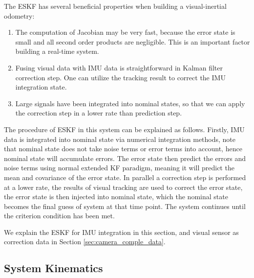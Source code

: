 The ESKF has several beneficial properties when building a visual-inertial odometry:                                                                                                                                                                                                                                                                                                              
\begin{enumerate}
	\item The computation of Jacobian may be very fast, because the error state is small and all second order products are negligible. This is an important factor building a real-time system.
	\item Fusing visual data with IMU data is straightforward in Kalman filter correction step. One can utilize the tracking result to correct the IMU integration state.
	\item Large signals have been integrated into nominal states, so that we can apply the correction step in a lower rate than prediction step.
\end{enumerate}

The procedure of ESKF in this system can be explained as follows. Firstly, IMU data is integrated into nominal state via numerical integration methods, note that nominal state does not take noise terms or error terms into account, hence nominal state will accumulate errors. The error state then predict the errors and noise terms using normal extended KF paradigm, meaning it will predict the mean and covariance of the error state. In parallel a correction step is performed at a lower rate, the results of visual tracking are used to correct the error state, the error state is then injected into nominal state, which the nominal state becomes the final guess of system at that time point. The system continues until the criterion condition has been met.

We explain the ESKF for IMU integration in this section, and visual sensor as correction data in Section \ref{sec:camera_comple_data}.


\subsection{System Kinematics}
\label{subsec:ESKF_IMU_sub2}

